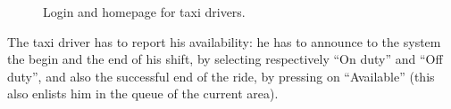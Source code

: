 \begin{figure}
	\hfill%
	\caption{Login and homepage for taxi drivers.}\label{fig:homeTaxi}
\end{figure}


The taxi driver has to report his availability: he has to announce to the system the begin and the end of his shift, by selecting respectively ``On duty'' and ``Off duty'', and also the successful end of the ride, by pressing on ``Available'' (this also enlists him in the queue of the current area).

